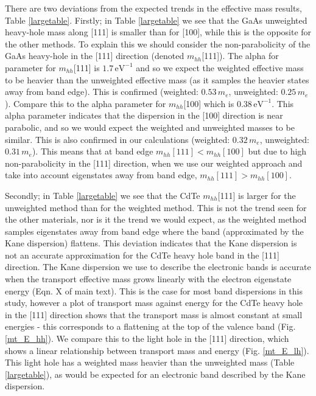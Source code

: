 There are two deviations from the expected trends in the effective mass results, Table \ref{largetable}. 
Firstly; in Table \ref{largetable} we see that the GaAs unweighted heavy-hole mass along [111] is smaller than for [100], while this is the opposite for the other methods. To explain this we should consider the non-parabolicity of the GaAs heavy-hole in the [111] direction (denoted $m_{hh}$[111]). The alpha for parameter for $m_{hh}$[111] is $1.7\,\mathrm{eV}^{-1}$ and so we expect the weighted effective mass to be heavier than the unweighted effective mass (as it samples the heavier states away from band edge). This is confirmed (weighted: $0.53\,m_e$, unweighted: $0.25\,m_e$). Compare this to the alpha parameter for $m_{hh}$[100] which is $0.38\,\mathrm{eV}^{-1}$. This alpha parameter indicates that the dispersion in the [100] direction is near parabolic, and so we would expect the weighted and unweighted masses to be similar. This is also confirmed in our calculations (weighted: $0.32\,m_e$, unweighted: $0.31\,m_e$).
This means that at band edge $m_{hh}\mathrm{[111]} < m_{hh}\mathrm{[100]}$ but due to high non-parabolicity in the [111] direction, when we use our weighted approach and take into account eigenstates away from band edge, $m_{hh}\mathrm{[111]} > m_{hh}\mathrm{[100]}$.

Secondly; in Table \ref{largetable} we see that the CdTe $m_{hh}$[111] is larger for the unweighted method than for the weighted method. This is not the trend seen for the other materials, nor is it the trend we would expect, as the weighted method samples eigenstates away from band edge where the band (approximated by the Kane dispersion) flattens.
This deviation indicates that the Kane dispersion is not an accurate approximation for the CdTe heavy hole band in the [111] direction. The Kane dispersion we use to describe the electronic bands is accurate when the transport effective mass grows linearly with the electron eigenstate energy (Eqn. X of main text). This is the case for most band dispersions in this study, however a plot of transport mass against energy for the CdTe heavy hole in the [111] direction shows that the transport mass is almost constant at small energies - this corresponds to a flattening at the top of the valence band (Fig. \ref{mt_E_hh}). We compare this to the light hole in the [111] direction, which shows a linear relationship between transport mass and energy (Fig. \ref{mt_E_lh}). This light hole has a weighted mass heavier than the unweighted mass (Table \ref{largetable}), as would be expected for an electronic band described by the Kane dispersion.

